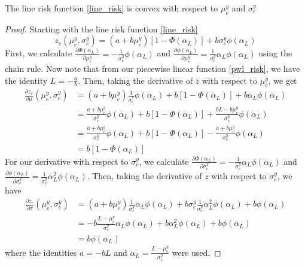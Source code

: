 \begin{lemma}
The line risk function \ref{line_risk} is convex with respect to $\mu^y_e$ and $\sigma^y_e$
\end{lemma}
\begin{proof}
Starting with the line risk function \ref{line_risk}
\begin{equation*}
z_e(\mu^y_e,\sigma^y_e) = (a + b \mu^y_e)\left[ 1 - \Phi(\alpha_L) \right]  + b \sigma^y_e \phi(\alpha_L) 
\end{equation*}
First, we calculate $\frac{\partial \Phi(\alpha_L)}{\partial \mu^y_e} = - \frac{1}{\sigma^y_e} \phi(\alpha_L)$ and $\frac{\partial \phi(\alpha_L)}{\partial \mu^y_e} =  \frac{1}{\sigma^y_e} \alpha_L \phi(\alpha_L)$ using the chain rule.  Now note that from our piecewise linear function \ref{pwl_risk}, we have the identity $L = -\frac{a}{b}$. Then, taking the derivative of $z$ with respect to $\mu^y_e$, we get  
\begin{align*}
\frac{\partial z_e}{\partial \mu}(\mu^y_e,\sigma^y_e) &= (a + b \mu^y_e) \frac{1}{\sigma^y_e} \phi(\alpha_L) + b \left[ 1 - \Phi(\alpha_L) \right] + b \alpha_L \phi(\alpha_L)\\
&= \frac{a + b \mu^y_e}{\sigma^y_e}\phi(\alpha_L)  + b \left[ 1 - \Phi(\alpha_L) \right] +  \frac{bL - b\mu^y_e}{\sigma^y_e}\phi(\alpha_L) \\
&= \frac{a + b \mu^y_e}{\sigma^y_e}\phi(\alpha_L)  + b \left[ 1 - \Phi(\alpha_L) \right] -  \frac{a + b\mu^y_e}{\sigma^y_e}\phi(\alpha_L)\\
& = b\left[ 1 - \Phi(\alpha_L) \right]
\end{align*}
For our derivative with respect to $\sigma^y_e$, we calculate $\frac{\partial \Phi(\alpha_L)}{\partial \sigma^y_e} = - \frac{1}{\sigma^y_e} \alpha_L \phi(\alpha_L)$ and $\frac{\partial \phi(\alpha_L)}{\partial \sigma^y_e} =  \frac{1}{\sigma^y_e} \alpha_L^2 \phi(\alpha_L)$.  Then, taking the derivative of $z$ with respect to $\sigma^y_e$, we have
\begin{align*}
\frac{\partial z_e}{\partial \sigma}(\mu^y_e,\sigma^y_e) & = (a+b\mu^y_e)\frac{1}{\sigma^y_e} \alpha_L  \phi(\alpha_L) + b \sigma^y_e \frac{1}{\sigma^y_e} \alpha_L^2  \phi(\alpha_L) + b \phi(\alpha_L)\\
& = -b\frac{L-\mu^y_e}{\sigma^y_e} \alpha_L  \phi(\alpha_L) + b \alpha_L^2  \phi(\alpha_L) + b \phi(\alpha_L)\\
 & = b \phi(\alpha_L) 
\end{align*} 
where the identities $a=-bL$ and $\alpha_L = \frac{L-\mu^y_e}{\sigma^y_e}$ were used.


\end{proof}
